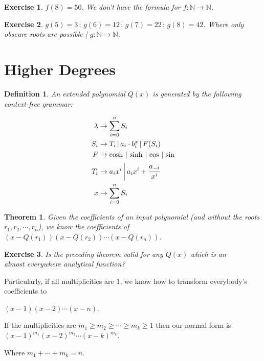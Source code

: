 \documentclass[12pt,a4paper]{article}
\newtheorem{exercise}{Exercise}[section]
\newtheorem{definition}{Definition}[section]
\newtheorem{thm}{Theorem}[section]
\begin{document}
\begin{exercise}
$f(8) = 50$. We don't have the formula for $f : \mathbb{N} \to \mathbb{N}$.
\end{exercise}

\begin{exercise}
$g(5) = 3\,;\,g(6) = 12\,;\,g(7) = 22\,;\,g(8) = 42$. Where only obscure roots are possible | $g : \mathbb{N} \to \mathbb{N}$.
\end{exercise}

\section{Higher Degrees}

\begin{definition}
An extended polynomial $Q(x)$ is generated by the following context-free grammar:
\end{definition}

\begin{align}
\lambda &\rightarrow \sum_{i = 0}^n S_i \\
S_i &\rightarrow T_i\,\vert\,a_i \cdot b_i^x\,\vert\,F(S_i) \\
F &\rightarrow \cosh\,\vert\,\sinh\,\vert\,\cos\,\vert\,\sin \\
T_i &\rightarrow a_i x^i\,\bigg\vert\,a_i x^i + \cfrac{a_{-i}}{x^i} \\
x &\rightarrow \sum_{i = 0}^n S_i
\end{align}

\begin{thm}
Given the coefficients of an input polynomial (and without the roots $r_1, r_2, \cdots, r_n$), we know the coefficients of $(x - Q(r_1))(x - Q(r_2))\cdots(x - Q(r_n))$.
\end{thm}

\begin{exercise}
Is the preceding theorem valid for any $Q(x)$ which is an \\
almost everywhere analytical function?
\end{exercise}

Particularly, if all multiplicities are $1$, we know how to transform everybody's coefficients to

$(x - 1)(x - 2)\cdots (x - n)$.

If the multiplicities are $m_1 \ge m_2 \ge \cdots \ge m_k \ge 1$ then our normal form is $(x - 1)^{m_1}(x - 2)^{m_2}\cdots (x - k)^{m_k}$.

Where $m_1 + \cdots + m_k = n$.
\end{document}
